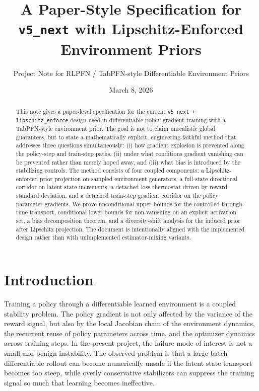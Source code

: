 \documentclass[11pt]{article}
\title{A Paper-Style Specification for \texttt{v5\_next} with Lipschitz-Enforced Environment Priors}
\author{Project Note for RLPFN / TabPFN-style Differentiable Environment Priors}
\date{March 8, 2026}
\newcommand{\1}{\mathbf{1}}
\begin{document}
\maketitle

\begin{abstract}
This note gives a paper-level specification for the current \texttt{v5\_next + lipschitz\_enforce} design used in differentiable policy-gradient training with a TabPFN-style environment prior. The goal is not to claim unrealistic global guarantees, but to state a mathematically explicit, engineering-faithful method that addresses three questions simultaneously: (i) how gradient explosion is prevented along the policy-step and train-step paths, (ii) under what conditions gradient vanishing can be prevented rather than merely hoped away, and (iii) what bias is introduced by the stabilizing controls. The method consists of four coupled components: a Lipschitz-enforced prior projection on sampled environment generators, a full-state directional corridor on latent state increments, a detached loss thermostat driven by reward standard deviation, and a detached train-step gradient corridor on the policy parameter gradients. We prove unconditional upper bounds for the controlled through-time transport, conditional lower bounds for non-vanishing on an explicit activation set, a bias decomposition theorem, and a diversity-shift analysis for the induced prior after Lipschitz projection. The document is intentionally aligned with the implemented design rather than with unimplemented estimator-mixing variants.
\end{abstract}

\section{Introduction}
Training a policy through a differentiable learned environment is a coupled stability problem. The policy gradient is not only affected by the variance of the reward signal, but also by the local Jacobian chain of the environment dynamics, the recurrent reuse of policy parameters across time, and the optimizer dynamics across training steps. In the present project, the failure mode of interest is not a small and benign instability. The observed problem is that a large-batch differentiable rollout can become numerically unsafe if the latent state transport becomes too steep, while overly conservative stabilizers can suppress the training signal so much that learning becomes ineffective.
\end{document}
